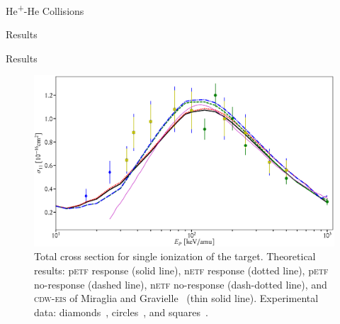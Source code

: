 \documentclass[letterpaper, 11 pt]{report}
\begin{document}
\begin{chapter}{\texorpdfstring{He\textsuperscript{+}}{He+}-He Collisions \label{chap:hephe}}
\begin{section}{Results \label{sec:hephe-disc}}
\begin{subsection}{Results \label{sec:hephe-res}}
         \begin{figure}[t]
            \centering
            \includegraphics[width = \linewidth]{./images/hephe-cross/HepHe-111.eps}
            \caption[Total cross section for single ionization of the target in He\textsuperscript{+}-He
                     collisions.]
                    {Total cross section for single ionization of the target.
                     Theoretical results: p\textsc{etf} response (solid line), n\textsc{etf} response
                                          (dotted line), p\textsc{etf} no-response (dashed line),
                                          n\textsc{etf} no-response (dash-dotted line), and
                                          \textsc{cdw-eis} of Miraglia and Gravielle~\cite{MG-10}
                                          (thin solid line).
                     Experimental data: diamonds~\cite{Dub-89}, circles~\cite{FTFHLP-95}, and
                                        squares~\cite{DT-88}.
                     \label{fig:cs111}}
         \end{figure}


\end{subsection}
\end{section}
\end{chapter}
\end{document}
